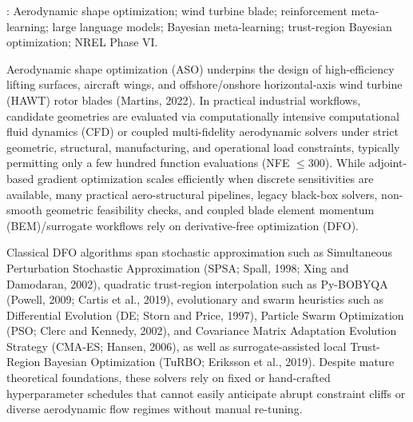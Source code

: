\documentclass[11pt,fleqn,letterpaper]{article}
\begin{document}
\par\vspace*{3pt}:
Aerodynamic shape optimization; wind turbine blade; reinforcement meta-learning; large language models; Bayesian meta-learning; trust-region Bayesian optimization; NREL Phase VI.

\par\vspace*{1mm}

Aerodynamic shape optimization (ASO) underpins the design of high-efficiency lifting surfaces, aircraft wings, and offshore/onshore horizontal-axis wind turbine (HAWT) rotor blades (Martins, 2022). In practical industrial workflows, candidate geometries are evaluated via computationally intensive computational fluid dynamics (CFD) or coupled multi-fidelity aerodynamic solvers under strict geometric, structural, manufacturing, and operational load constraints, typically permitting only a few hundred function evaluations (NFE $\le 300$). While adjoint-based gradient optimization scales efficiently when discrete sensitivities are available, many practical aero-structural pipelines, legacy black-box solvers, non-smooth geometric feasibility checks, and coupled blade element momentum (BEM)/surrogate workflows rely on derivative-free optimization (DFO).

Classical DFO algorithms span stochastic approximation such as Simultaneous Perturbation Stochastic Approximation (SPSA; Spall, 1998; Xing and Damodaran, 2002), quadratic trust-region interpolation such as Py-BOBYQA (Powell, 2009; Cartis et al., 2019), evolutionary and swarm heuristics such as Differential Evolution (DE; Storn and Price, 1997), Particle Swarm Optimization (PSO; Clerc and Kennedy, 2002), and Covariance Matrix Adaptation Evolution Strategy (CMA-ES; Hansen, 2006), as well as surrogate-assisted local Trust-Region Bayesian Optimization (TuRBO; Eriksson et al., 2019). Despite mature theoretical foundations, these solvers rely on fixed or hand-crafted hyperparameter schedules that cannot easily anticipate abrupt constraint cliffs or diverse aerodynamic flow regimes without manual re-tuning.
\end{document}
